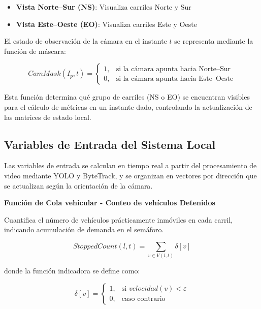 \documentclass[12pt,a4paper,oneside]{report}
\begin{document}
\begin{itemize}
\item
  \textbf{Vista Norte--Sur (NS)}: Visualiza carriles Norte y Sur
\item
  \textbf{Vista Este--Oeste (EO)}: Visualiza carriles Este y Oeste
\end{itemize}

El estado de observación de la cámara en el instante \(t\) se representa mediante la función de máscara:

\begin{equation}
CamMask(I_{p},t) =
\begin{cases}
1, & \text{si la cámara apunta hacia Norte--Sur}\\[2pt]
0, & \text{si la cámara apunta hacia Este--Oeste}
\end{cases}
\label{eq:cammask}
\end{equation}

Esta función determina qué grupo de carriles (NS o EO) se encuentran visibles para el cálculo de métricas en un instante dado, controlando la actualización de las matrices de estado local.

\subsection{Variables de Entrada del Sistema Local}\label{variables-de-entrada-del-sistema-local}

Las variables de entrada se calculan en tiempo real a partir del procesamiento de video mediante YOLO y ByteTrack, y se organizan en vectores por dirección que se actualizan según la orientación de la cámara.

\textbf{Función de Cola vehicular - Conteo de vehículos Detenidos}

Cuantifica el número de vehículos prácticamente inmóviles en cada carril, indicando acumulación de demanda en el semáforo.

\begin{equation}
StoppedCount(l,t) = \sum_{v \in V(l,t)}\delta[v]
\label{eq:stoppedcount}
\end{equation}

donde la función indicadora se define como:

\begin{equation}
\delta[v] =
\begin{cases}
1, & \text{si } velocidad(v) < \varepsilon\\[2pt]
0, & \text{caso contrario}
\end{cases}
\end{equation}
\end{document}
